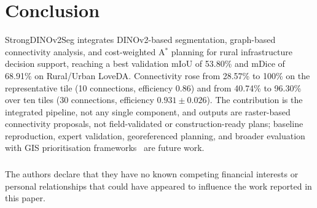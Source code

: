\section{Conclusion}
StrongDINOv2Seg integrates DINOv2-based segmentation, graph-based connectivity analysis, and cost-weighted A$^{*}$ planning for rural infrastructure decision support, reaching a best validation mIoU of 53.80\% and mDice of 68.91\% on Rural/Urban LoveDA. Connectivity rose from 28.57\% to 100\% on the representative tile (10 connections, efficiency 0.86) and from 40.74\% to 96.30\% over ten tiles (30 connections, efficiency $0.931\pm0.026$). The contribution is the integrated pipeline, not any single component, and outputs are raster-based connectivity proposals, not field-validated or construction-ready plans; baseline reproduction, expert validation, georeferenced planning, and broader evaluation with GIS prioritisation frameworks~\cite{verma2020,kapoor2021} are future work.

\begin{credits}
\subsubsection{\discintname}
The authors declare that they have no known competing financial interests or personal relationships that could have appeared to influence the work reported in this paper.
\end{credits}

